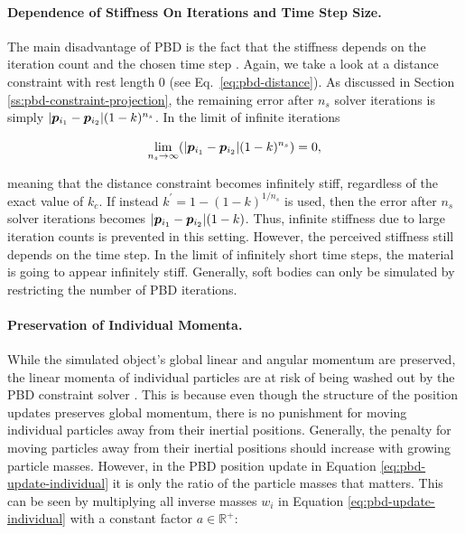 \paragraph{Dependence of Stiffness On Iterations and Time Step Size.}
The main disadvantage of PBD is the fact that the stiffness depends on the iteration count and the chosen time step \cite{mueller2006}. Again, 
we take a look at
a distance constraint with rest length 0 (see Eq.\ \ref{eq:pbd-distance}). As discussed in Section \ref{ss:pbd-constraint-projection}, the remaining error after
$n_s$ solver iterations is simply $\vert \bm{p}_{i_1} - \bm{p}_{i_2} \vert (1-k)^{n_s}$. In the limit of infinite iterations

\[
    \lim_{n_s \to \infty} (\vert \bm{p}_{i_1} - \bm{p}_{i_2} \vert (1-k)^{n_s}) = 0,
\]

\noindent meaning that the distance constraint becomes infinitely stiff, regardless of the exact value of $k_c$. If instead $k^{\prime}
= 1 - (1-k)^{1/n_s}$ is used, then the error after $n_s$ solver iterations becomes $\vert \bm{p}_{i_1} - \bm{p}_{i_2} \vert (1-k)$. Thus,
infinite stiffness due to large iteration counts is prevented in this setting. However, the perceived stiffness still depends on the time
step. In the limit of infinitely short time steps, the material is going to appear infinitely stiff. Generally, soft bodies can only be 
simulated by restricting the number of PBD iterations.

\paragraph{Preservation of Individual Momenta.}
While the simulated object's global linear and angular momentum are preserved, the linear momenta of individual particles are at risk of 
being washed out by the PBD constraint solver \cite{bouaziz2014}. This is because even though the structure of the position updates 
preserves global momentum, there is no punishment for moving individual particles away from their inertial positions. Generally, the 
penalty for moving particles away from their inertial positions should increase with growing particle masses. However, in the PBD
position update in Equation \ref{eq:pbd-update-individual} it is only the ratio of the particle masses that matters. This can be seen by multiplying
all inverse masses $w_i$ in Equation \ref{eq:pbd-update-individual} with a constant factor $a \in \mathbb{R}^+$:


